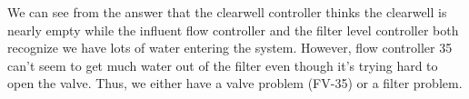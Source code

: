 We can see from the answer that the clearwell controller thinks the clearwell is nearly empty while the influent flow controller and the filter level controller both recognize we have lots of water entering the system.  However, flow controller 35 can't seem to get much water out of the filter even though it's trying hard to open the valve.  Thus, we either have a valve problem (FV-35) or a filter problem.





